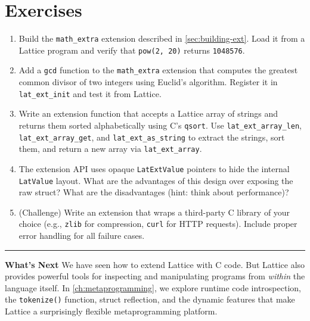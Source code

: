 \section*{Exercises}

\begin{enumerate}
  \item Build the \lstinline|math_extra| extension described in \cref{sec:building-ext}. Load it from a Lattice program and verify that \lstinline|pow(2, 20)| returns \lstinline|1048576|.

  \item Add a \lstinline|gcd| function to the \lstinline|math_extra| extension that computes the greatest common divisor of two integers using Euclid's algorithm. Register it in \lstinline|lat_ext_init| and test it from Lattice.

  \item Write an extension function that accepts a Lattice array of strings and returns them sorted alphabetically using C's \lstinline|qsort|. Use \lstinline|lat_ext_array_len|, \lstinline|lat_ext_array_get|, and \lstinline|lat_ext_as_string| to extract the strings, sort them, and return a new array via \lstinline|lat_ext_array|.

  \item The extension API uses opaque \lstinline|LatExtValue| pointers to hide the internal \lstinline|LatValue| layout. What are the advantages of this design over exposing the raw struct? What are the disadvantages (hint: think about performance)?

  \item (Challenge) Write an extension that wraps a third-party C library of your choice (e.g., \lstinline|zlib| for compression, \lstinline|curl| for HTTP requests). Include proper error handling for all failure cases.
\end{enumerate}

\bigskip
\begin{center}\rule{0.5\linewidth}{0.4pt}\end{center}

\textbf{What's Next}\quad
We have seen how to extend Lattice with C code. But Lattice also provides powerful tools for inspecting and manipulating programs from \emph{within} the language itself.
In \cref{ch:metaprogramming}, we explore runtime code introspection, the \lstinline|tokenize()| function, struct reflection, and the dynamic features that make Lattice a surprisingly flexible metaprogramming platform.
